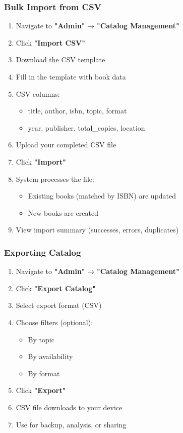 \documentclass[12pt,a4paper]{article}
\begin{document}
\subsubsection{Bulk Import from CSV}
\begin{enumerate}[leftmargin=*]
    \item Navigate to \textbf{"Admin"} → \textbf{"Catalog Management"}
    \item Click \textbf{"Import CSV"}
    \item Download the CSV template
    \item Fill in the template with book data
    \item CSV columns:
        \begin{itemize}
            \item title, author, isbn, topic, format
            \item year, publisher, total\_copies, location
        \end{itemize}
    \item Upload your completed CSV file
    \item Click \textbf{"Import"}
    \item System processes the file:
        \begin{itemize}
            \item Existing books (matched by ISBN) are updated
            \item New books are created
        \end{itemize}
    \item View import summary (successes, errors, duplicates)
\end{enumerate}

\subsubsection{Exporting Catalog}
\begin{enumerate}[leftmargin=*]
    \item Navigate to \textbf{"Admin"} → \textbf{"Catalog Management"}
    \item Click \textbf{"Export Catalog"}
    \item Select export format (CSV)
    \item Choose filters (optional):
        \begin{itemize}
            \item By topic
            \item By availability
            \item By format
        \end{itemize}
    \item Click \textbf{"Export"}
    \item CSV file downloads to your device
    \item Use for backup, analysis, or sharing
\end{enumerate}
\end{document}
